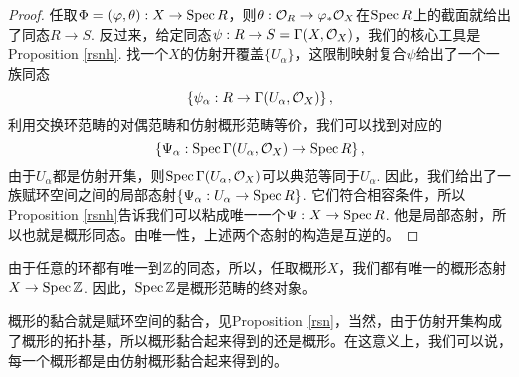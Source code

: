 \begin{proof}
	任取$\Phi=(\varphi,\theta):X\to \operatorname{Spec} R$，则$\theta:\mathcal{O}_R\to \varphi_*\mathcal{O}_X$在$\operatorname{Spec} R$上的截面就给出了同态$R\to S$. 反过来，给定同态$\psi:R\to S=\Gamma(X,\mathcal{O}_X)$，我们的核心工具是Proposition \ref{rsnh}. 找一个$X$的仿射开覆盖$\{U_\alpha\}$，这限制映射复合$\psi$给出了一个一族同态
	\[
	\left\{\psi_\alpha:R\to \Gamma(U_\alpha,\mathcal{O}_X)\right\},
	\]
	利用交换环范畴的对偶范畴和仿射概形范畴等价，我们可以找到对应的
	\[
	\left\{\Psi_\alpha:\operatorname{Spec}\Gamma(U_\alpha,\mathcal{O}_X)\to \operatorname{Spec} R\right\},
	\]
	由于$U_\alpha$都是仿射开集，则$\operatorname{Spec}\Gamma(U_\alpha,\mathcal{O}_X)$可以典范等同于$U_\alpha$. 因此，我们给出了一族赋环空间之间的局部态射$\left\{\Psi_\alpha: U_\alpha \to \operatorname{Spec} R\right\}$. 它们符合相容条件，所以Proposition \ref{rsnh}告诉我们可以粘成唯一一个$\Psi:X\to \operatorname{Spec} R$. 他是局部态射，所以也就是概形同态。由唯一性，上述两个态射的构造是互逆的。
\end{proof}

由于任意的环都有唯一到$\mathbb{Z}$的同态，所以，任取概形$X$，我们都有唯一的概形态射$X\to \operatorname{Spec} \mathbb{Z}$. 因此，$\operatorname{Spec} \mathbb{Z}$是概形范畴的终对象。

\begin{para}[概形的黏合]
概形的黏合就是赋环空间的黏合，见Proposition \ref{rsn}，当然，由于仿射开集构成了概形的拓扑基，所以概形黏合起来得到的还是概形。在这意义上，我们可以说，每一个概形都是由仿射概形黏合起来得到的。
\end{para}

